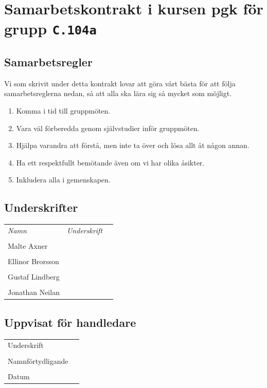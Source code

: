 \documentclass[12pt]{article}
\begin{document}
\clearpage\thispagestyle{empty}

\section*{Samarbetskontrakt i kursen pgk för grupp \texttt{C.104a}}
\subsection*{Samarbetsregler}
Vi som skrivit under detta kontrakt lovar att göra vårt bästa för att följa samarbetsreglerna nedan, så att alla ska lära sig så mycket som möjligt. 
\begin{enumerate}
\item Komma i tid till gruppmöten.
\item Vara väl förberedda genom självstudier inför gruppmöten.
\item Hjälpa varandra att förstå, men inte ta över och lösa allt åt någon annan.
\item Ha ett respektfullt bemötande även om vi har olika åsikter.
\item Inkludera alla i gemenskapen.
\end{enumerate}

\subsection*{Underskrifter}
\vspace{1em}

\begin{tabular}{l l p{7cm}}
\emph{Namn} & \emph{Underskrift} \\
\\ Malte Axner & \dotfill \\
\\ Ellinor Brorsson & \dotfill \\
\\ Gustaf Lindberg & \dotfill \\
\\ Jonathan Neilan & \dotfill \\
\end{tabular}

\vspace{1em }
\subsection*{Uppvisat för handledare}

\begin{tabular}{l p{8cm}}
\\ Underskrift &  \dotfill \\
\\ Namnförtydligande &  \dotfill \\
\\ Datum & \dotfill \\
\end{tabular}
\end{document}
